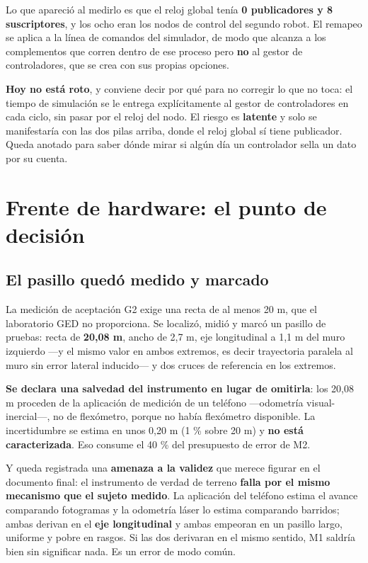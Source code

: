 \documentclass[12pt,letterpaper]{article}
\begin{document}
Lo que apareció al medirlo es que el reloj global tenía \textbf{0 publicadores y 8 suscriptores}, y los ocho eran los nodos de control del segundo robot. El remapeo se aplica a la línea de comandos del simulador, de modo que alcanza a los complementos que corren dentro de ese proceso pero \textbf{no} al gestor de controladores, que se crea con sus propias opciones.

\textbf{Hoy no está roto}, y conviene decir por qué para no corregir lo que no toca: el tiempo de simulación se le entrega explícitamente al gestor de controladores en cada ciclo, sin pasar por el reloj del nodo. El riesgo es \textbf{latente} y solo se manifestaría con las dos pilas arriba, donde el reloj global sí tiene publicador. Queda anotado para saber dónde mirar si algún día un controlador sella un dato por su cuenta.

\section{Frente de hardware: el punto de decisión}
\label{sec:g2}

\subsection{El pasillo quedó medido y marcado}

La medición de aceptación G2 exige una recta de al menos 20 m, que el laboratorio GED no proporciona. Se localizó, midió y marcó un pasillo de pruebas: recta de \textbf{20,08 m}, ancho de 2,7 m, eje longitudinal a 1,1 m del muro izquierdo ---y el mismo valor en ambos extremos, es decir trayectoria paralela al muro sin error lateral inducido--- y dos cruces de referencia en los extremos.

\textbf{Se declara una salvedad del instrumento en lugar de omitirla}: los 20,08 m proceden de la aplicación de medición de un teléfono ---odometría visual-inercial---, no de flexómetro, porque no había flexómetro disponible. La incertidumbre se estima en unos 0,20 m (1 \% sobre 20 m) y \textbf{no está caracterizada}. Eso consume el 40 \% del presupuesto de error de M2.

Y queda registrada una \textbf{amenaza a la validez} que merece figurar en el documento final: el instrumento de verdad de terreno \textbf{falla por el mismo mecanismo que el sujeto medido}. La aplicación del teléfono estima el avance comparando fotogramas y la odometría láser lo estima comparando barridos; ambas derivan en el \textbf{eje longitudinal} y ambas empeoran en un pasillo largo, uniforme y pobre en rasgos. Si las dos derivaran en el mismo sentido, M1 saldría bien sin significar nada. Es un error de modo común.
\end{document}
